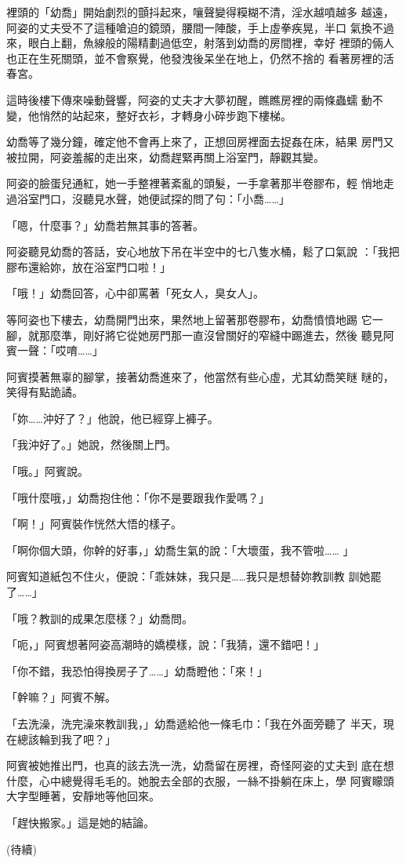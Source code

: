 裡頭的「幼喬」開始劇烈的顫抖起來，嚷聲變得糢糊不清，淫水越噴越多
越遠，阿姿的丈夫受不了這種嗆迫的鏡頭，腰間一陣酸，手上虛拳疾晃，半口
氣換不過來，眼白上翻，魚線般的陽精劃過低空，射落到幼喬的房間裡，幸好
裡頭的倆人也正在生死關頭，並不會察覺，他發洩後呆坐在地上，仍然不捨的
看著房裡的活春宮。

這時後樓下傳來噪動聲響，阿姿的丈夫才大夢初醒，瞧瞧房裡的兩條蟲蠕
動不變，他悄然的站起來，整好衣衫，才轉身小碎步跑下樓梯。

幼喬等了幾分鐘，確定他不會再上來了，正想回房裡面去捉姦在床，結果
房門又被拉開，阿姿羞赧的走出來，幼喬趕緊再關上浴室門，靜觀其變。

阿姿的臉蛋兒通紅，她一手整裡著紊亂的頭髮，一手拿著那半卷膠布，輕
悄地走過浴室門口，沒聽見水聲，她便試探的問了句：「小喬……」

「嗯，什麼事？」幼喬若無其事的答著。

阿姿聽見幼喬的答話，安心地放下吊在半空中的七八隻水桶，鬆了口氣說
：「我把膠布還給妳，放在浴室門口啦！」

「哦！」幼喬回答，心中卻罵著「死女人，臭女人」。

等阿姿也下樓去，幼喬開門出來，果然地上留著那卷膠布，幼喬憤憤地踢
它一腳，就那麼準，剛好將它從她房門那一直沒曾關好的窄縫中踢進去，然後
聽見阿賓一聲：「哎唷……」

阿賓摸著無辜的腳掌，接著幼喬進來了，他當然有些心虛，尤其幼喬笑瞇
瞇的，笑得有點詭譎。

「妳……沖好了？」他說，他已經穿上褲子。

「我沖好了。」她說，然後關上門。

「哦。」阿賓說。

「哦什麼哦，」幼喬抱住他：「你不是要跟我作愛嗎？」

「啊！」阿賓裝作恍然大悟的樣子。

「啊你個大頭，你幹的好事，」幼喬生氣的說：「大壞蛋，我不管啦……
」

阿賓知道紙包不住火，便說：「乖妹妹，我只是……我只是想替妳教訓教
訓她罷了……」

「哦？教訓的成果怎麼樣？」幼喬問。

「呃，」阿賓想著阿姿高潮時的嬌模樣，說：「我猜，還不錯吧！」

「你不錯，我恐怕得換房子了……」幼喬瞪他：「來！」

「幹嘛？」阿賓不解。

「去洗澡，洗完澡來教訓我，」幼喬遞給他一條毛巾：「我在外面旁聽了
半天，現在總該輪到我了吧？」

阿賓被她推出門，也真的該去洗一洗，幼喬留在房裡，奇怪阿姿的丈夫到
底在想什麼，心中總覺得毛毛的。她脫去全部的衣服，一絲不掛躺在床上，學
阿賓矇頭大字型睡著，安靜地等他回來。

「趕快搬家。」這是她的結論。

(待續)










